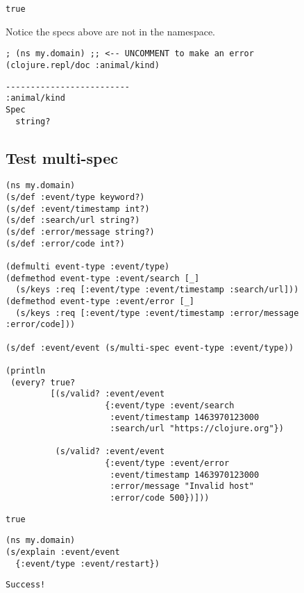 \documentclass[10pt,oneside,x11names]{article}
\begin{document}
\begin{verbatim}
true
\end{verbatim}


Notice the specs above are not in the namespace.

\begin{verbatim}
; (ns my.domain) ;; <-- UNCOMMENT to make an error
(clojure.repl/doc :animal/kind)
\end{verbatim}

\begin{verbatim}
-------------------------
:animal/kind
Spec
  string?
\end{verbatim}

\subsection{Test multi-spec}
\label{sec:org1741332}

\begin{verbatim}
(ns my.domain)
(s/def :event/type keyword?)
(s/def :event/timestamp int?)
(s/def :search/url string?)
(s/def :error/message string?)
(s/def :error/code int?)

(defmulti event-type :event/type)
(defmethod event-type :event/search [_]
  (s/keys :req [:event/type :event/timestamp :search/url]))
(defmethod event-type :event/error [_]
  (s/keys :req [:event/type :event/timestamp :error/message :error/code]))

(s/def :event/event (s/multi-spec event-type :event/type))

(println
 (every? true?
         [(s/valid? :event/event
                    {:event/type :event/search
                     :event/timestamp 1463970123000
                     :search/url "https://clojure.org"})

          (s/valid? :event/event
                    {:event/type :event/error
                     :event/timestamp 1463970123000
                     :error/message "Invalid host"
                     :error/code 500})]))
\end{verbatim}

\begin{verbatim}
true
\end{verbatim}


\begin{verbatim}
(ns my.domain)
(s/explain :event/event
  {:event/type :event/restart})
\end{verbatim}

\begin{verbatim}
Success!
\end{verbatim}
\end{document}
